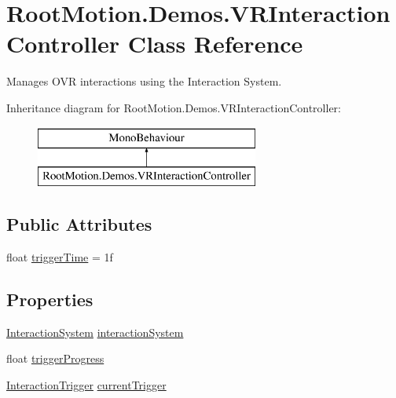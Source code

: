 \hypertarget{class_root_motion_1_1_demos_1_1_v_r_interaction_controller}{}\section{Root\+Motion.\+Demos.\+V\+R\+Interaction\+Controller Class Reference}
\label{class_root_motion_1_1_demos_1_1_v_r_interaction_controller}


Manages O\+VR interactions using the Interaction System.  


Inheritance diagram for Root\+Motion.\+Demos.\+V\+R\+Interaction\+Controller\+:\begin{figure}[H]
\begin{center}
\leavevmode
\includegraphics[height=2.000000cm]{class_root_motion_1_1_demos_1_1_v_r_interaction_controller}
\end{center}
\end{figure}
\subsection*{Public Attributes}
\begin{DoxyCompactItemize}
\item 
float \mbox{\hyperlink{class_root_motion_1_1_demos_1_1_v_r_interaction_controller_a7680772ee3ab32e21454b8baab71d4f9}{trigger\+Time}} = 1f
\end{DoxyCompactItemize}
\subsection*{Properties}
\begin{DoxyCompactItemize}
\item 
\mbox{\hyperlink{class_root_motion_1_1_final_i_k_1_1_interaction_system}{Interaction\+System}} \mbox{\hyperlink{class_root_motion_1_1_demos_1_1_v_r_interaction_controller_a8df7c7de3858f7cdccb5641220c09f0b}{interaction\+System}}
\item 
float \mbox{\hyperlink{class_root_motion_1_1_demos_1_1_v_r_interaction_controller_ab3eedbdbc29f28a3438c1911d7d3ce64}{trigger\+Progress}}
\item 
\mbox{\hyperlink{class_root_motion_1_1_final_i_k_1_1_interaction_trigger}{Interaction\+Trigger}} \mbox{\hyperlink{class_root_motion_1_1_demos_1_1_v_r_interaction_controller_ab160de772d3d2846787a41aad9f16e13}{current\+Trigger}}
\end{DoxyCompactItemize}


